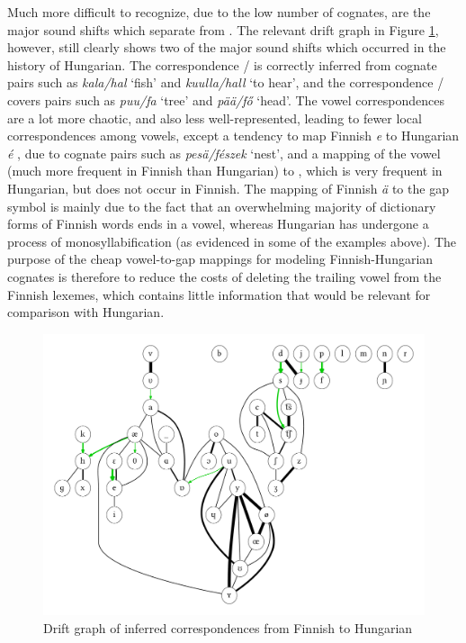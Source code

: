 Much more difficult to recognize, due to the low number of cognates, are the major sound shifts which separate  from . The relevant drift graph in Figure \ref{fig:driftGraphFiHu}, however, still clearly shows two of the major sound shifts which occurred in the history of Hungarian. The correspondence \ipa{[k]}/\ipa{[h]} is correctly inferred from cognate pairs such as \textit{kala/hal} `fish' and \textit{kuulla/hall} `to hear', and the correspondence \ipa{[p]}/\ipa{[f]} covers pairs such as \textit{puu/fa} `tree' and \textit{p\"a\"a/f\H{o}} `head'. The vowel correspondences are a lot more chaotic, and also less well-represented, leading to fewer local correspondences among vowels, except a tendency to map Finnish \textit{e} \ipa{[E]} to Hungarian \textit{\'e} \ipa{[e]}, due to cognate pairs such as \textit{pes\"a/f\'eszek} `nest', and a mapping of the vowel \ipa{[u]} (much more frequent in Finnish than Hungarian) to \ipa{[6]}, which is very frequent in Hungarian, but does not occur 
in Finnish. The mapping of Finnish \textit{\"a} \ipa{[\ae]} to the gap symbol is mainly due to the fact that an overwhelming majority of dictionary forms of Finnish words ends in a vowel, whereas Hungarian has undergone a process of monosyllabification (as evidenced in some of the examples above). The purpose of the cheap vowel-to-gap mappings for modeling Finnish-Hungarian cognates is therefore to reduce the costs of deleting the trailing vowel from the Finnish lexemes, which contains little information that would be relevant for comparison with Hungarian.

\begin{figure}[h!]
    \includegraphics[width=\textwidth]{figures/drift-graph-fi-hu.pdf}
    \caption{Drift graph of inferred correspondences from Finnish to Hungarian}
    \label{fig:driftGraphFiHu}
\end{figure}

